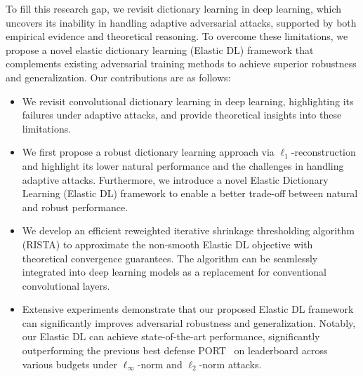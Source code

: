 To fill this research gap, we revisit dictionary learning in deep learning, which uncovers its inability in handling adaptive adversarial attacks, supported by both empirical evidence and theoretical reasoning.
To overcome these limitations, we propose a novel elastic dictionary learning (Elastic DL) framework that complements existing adversarial training methods to achieve superior robustness and generalization.
Our contributions are as follows:
\begin{itemize}[left=0pt]
    \item We revisit convolutional dictionary learning in deep learning, highlighting its failures under adaptive attacks, and provide theoretical insights into these limitations.
    \item  We first propose a robust dictionary learning approach via $\ell_1$-reconstruction and highlight its lower natural performance and the challenges in handling adaptive attacks. Furthermore, we introduce a novel Elastic Dictionary Learning (Elastic DL) framework to enable a better trade-off between natural and robust performance.
    \item We develop an efficient reweighted iterative  shrinkage thresholding algorithm (RISTA) to approximate the non-smooth Elastic DL objective with theoretical convergence guarantees. The algorithm can be seamlessly integrated into deep learning models as a replacement for conventional convolutional layers.
    \item Extensive experiments demonstrate that our proposed Elastic DL framework can significantly improves adversarial  robustness and generalization. 
    Notably, our Elastic DL can achieve state-of-the-art performance, significantly outperforming the previous best defense PORT~\cite{sehwag2021robust} on leaderboard across various budgets under $\ell_\infty$-norm and $\ell_2$-norm attacks.
\end{itemize}



